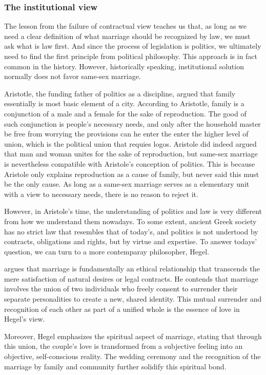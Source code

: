 \documentclass{article}
\begin{document}
\subsubsection{The institutional view}

The lesson from the failure of contractual view teaches us that, as long as we need a clear definition of what marriage should be recognized by law, we must ask what is law first. And since the process of legislation is politics, we ultimately need to find the first principle from political philosophy. This approach is in fact common in the history. However, historically speaking, institutional solution normally does not favor same-sex marriage.

Aristotle, the funding father of politics as a discipline, argued that family essentially is most basic element of a city. According to Aristotle, family is a conjunction of a male and a female for the sake of reproduction. The good of such conjunction is people's necessary needs, and only after the household master be free from worrying the provisions can he enter the enter the higher level of union, which is the political union that requies logos.\autocite{aristotePolitics1984} Aristole did indeed argued that man and woman unites for the sake of reproduction, but same-sex marriage is nevertheless compatible with Aristole's conception of politics. This is because Aristole only explains reproduction as a cause of family, but never said this must be the only cause. As long as a same-sex marriage serves as a elementary unit with a view to necessary needs, there is no reason to reject it. 

However, in Aristole's time, the understanding of politics and law is very different from how we understand them nowadays. To some extent, ancient Greek society has no strict law that resembles that of today's, and politics is not undertood by contracts, obligations and rights, but by virtue and expertise. To answer todays' question, we can turn to a more contemparay philosopher, Hegel.

\textcite{hegelPhilosophyRight1821a} argues that marriage is fundamentally an ethical relationship that transcends the mere satisfaction of natural desires or legal contracts. He contends that marriage involves the union of two individuals who freely consent to surrender their separate personalities to create a new, shared identity. This mutual surrender and recognition of each other as part of a unified whole is the essence of love in Hegel's view.

Moreover, Hegel emphasizes the spiritual aspect of marriage, stating that through this union, the couple's love is transformed from a subjective feeling into an objective, self-conscious reality. The wedding ceremony and the recognition of the marriage by family and community further solidify this spiritual bond.
\end{document}
